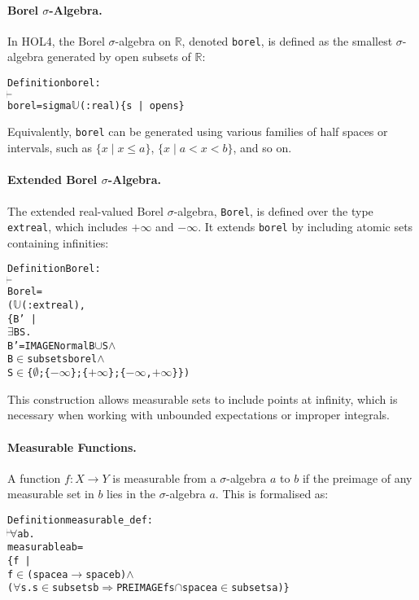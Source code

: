 \paragraph{Borel $\sigma$-Algebra.}
In HOL4, the Borel $\sigma$-algebra on $ \mathbb{R} $, denoted \texttt{borel}, is defined as the smallest $\sigma$-algebra generated by open subsets of $ \mathbb{R} $:
\begin{hol}
  \begin{alltt}
    Definition borel :
    \(\!\!\!{\turn}\!\!\!\!\)
    borel = sigma \(\mathbb{U}\)(:real) \{s \,|\, open s\}
  \end{alltt}
\end{hol}


Equivalently, \texttt{borel} can be generated using various families of half spaces or intervals, such as $ \{ x \mid x \leq a \} $, $ \{ x \mid a < x < b \} $, and so on.

\paragraph{Extended Borel $\sigma$-Algebra.}
The extended real-valued Borel $\sigma$-algebra, \texttt{Borel}, is defined over the type \texttt{extreal}, which includes $ +\infty $ and $ -\infty $. It extends \texttt{borel} by including atomic sets containing infinities:

\begin{hol}
  \begin{alltt}
    Definition Borel :
    \(\!\!\!{\turn}\!\!\!\!\)
    Borel =
    (\(\mathbb{U}\)(:extreal),
    \{B' \,|\,
    \(\exists\)B S.
    B' = IMAGE Normal B \(\cup\) S \(\land\)
    B \(\in\) subsets borel \(\land\)
    S \(\in\) \{\(\emptyset\); \{\(-\infty\)\}; \{\(+\infty\)\}; \{\(-\infty\), \(+\infty\)\}\})
  \end{alltt}
\end{hol}


This construction allows measurable sets to include points at infinity, which is necessary when working with unbounded expectations or improper integrals.

\paragraph{Measurable Functions.}
A function $ f : X \to Y $ is measurable from a $\sigma$-algebra $ a $ to $ b $ if the preimage of any measurable set in $ b $ lies in the $\sigma$-algebra $ a $. This is formalised as:

\begin{hol}
  \begin{alltt}
    Definition measurable\_def :
    \(\!\!\!{\turn}\!\!\!\!\) \(\forall\)a b.
    measurable a b =
    \{f \,|\,
    f \(\in\) (space a \(\rightarrow\) space b) \(\land\)
    (\(\forall\)s. s \(\in\) subsets b \(\Rightarrow\) PREIMAGE f s \(\cap\) space a \(\in\) subsets a)\}
  \end{alltt}
\end{hol}

